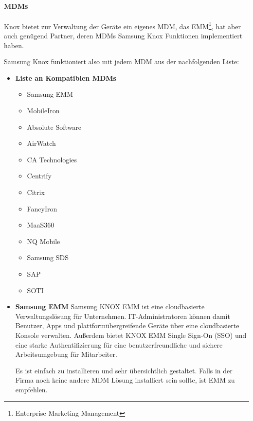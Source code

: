 \paragraph{MDMs}
Knox bietet zur Verwaltung der Geräte ein eigenes MDM, das EMM\footnote{Enterprise Marketing Management}, hat aber auch genügend Partner, deren MDMs Samsung Knox Funktionen implementiert haben. \par
Samsung Knox funktioniert also mit jedem MDM aus der nachfolgenden Liste:
\begin{itemize}
	\item \textbf{Liste an Kompatiblen MDMs}
	\begin{itemize}
		\item Samsung EMM
		\item MobileIron
		\item Absolute Software
		\item AirWatch
		\item CA Technologies
		\item Centrify
		\item Citrix
		\item FancyIron
		\item MaaS360
		\item NQ Mobile
		\item Samsung SDS
		\item SAP
		\item SOTI
	\end{itemize}
	\item \textbf{Samsung EMM} \newline
	Samsung KNOX EMM ist eine cloudbasierte Verwaltungslösung für Unternehmen. IT-Administratoren können damit Benutzer, Apps und plattformübergreifende Geräte über eine cloudbasierte Konsole verwalten. Außerdem bietet KNOX EMM Single Sign-On (SSO) und eine starke Authentifizierung für eine benutzerfreundliche und sichere Arbeitsumgebung für Mitarbeiter. \par Es ist einfach zu installieren und sehr übersichtlich gestaltet. Falls in der Firma noch keine andere MDM Lösung installiert sein sollte, ist EMM zu empfehlen.
\end{itemize}




